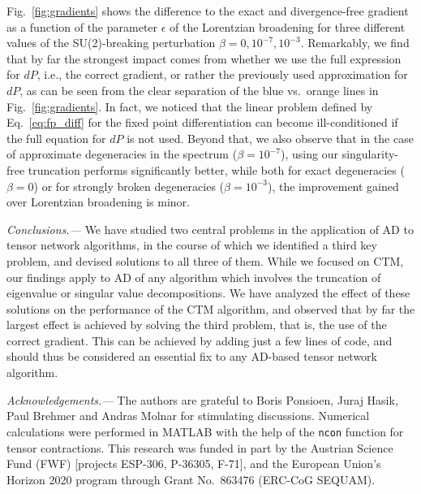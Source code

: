 \documentclass[twocolumn,floatfix,superscriptaddress,longbibliography,pra]{revtex4-2}
\renewcommand{\section}[1]{\emph{#1.---}}
\begin{document}
Fig.~\ref{fig:gradients} shows the difference to the exact and divergence-free gradient as a function of the parameter $\epsilon$ of the Lorentzian broadening for three different values of the SU(2)-breaking perturbation $\beta=0,10^{-7},10^{-3}$. Remarkably, we find that by far the strongest impact comes from whether we use the full expression for $dP$, i.e., the correct gradient, or rather the previously used approximation for $dP$, as can be seen from the clear separation of the blue vs.\ orange lines in Fig.~\ref{fig:gradients}. 
In fact, we noticed that the linear problem defined by Eq.~\eqref{eq:fp_diff} for the fixed point differentiation can become ill-conditioned if the full equation for $dP$ is not used. 
Beyond that, we also observe that in the case of approximate degeneracies in the spectrum ($\beta=10^{-7}$), using our singularity-free truncation performs significantly better, while both for exact degeneracies ($\beta=0$) or for strongly broken degeneracies ($\beta=10^{-3}$), the improvement gained over Lorentzian broadening is minor.


\section{Conclusions}%
We have studied two central problems in the application of AD to tensor network algorithms, in the course of which we identified a third key problem, and devised solutions to all three of them. 
While we focused on CTM, our findings apply to AD of any algorithm which involves the truncation of eigenvalue or singular value decompositions. We have analyzed the effect of these solutions on the  performance of the CTM algorithm, and observed that by far the largest effect is achieved by solving the third problem, that is, the use of the correct gradient. This can be achieved by adding just a few lines of code, and should thus be considered an essential fix to any AD-based tensor network algorithm.




\section{Acknowledgements}%
The authors are grateful to Boris Ponsioen, Juraj Hasik, Paul Brehmer and Andras Molnar for stimulating discussions. 
Numerical calculations were performed in MATLAB with the help of the \verb+ncon+ function \cite{ncon} for tensor contractions. 
This research was funded in part by the Austrian Science Fund (FWF) [projects \mbox{ESP-306}, P-36305, F-71], and the European Union’s Horizon 2020 program through Grant No.\ 863476 (ERC-CoG \mbox{SEQUAM}).
\end{document}
